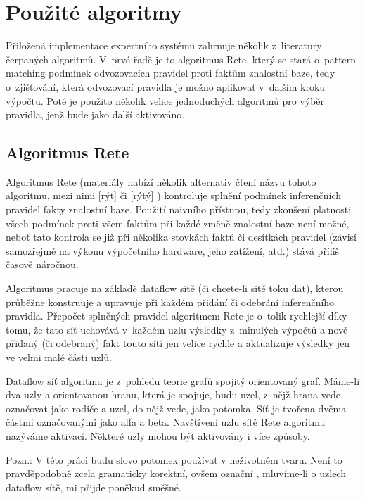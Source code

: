\section{Použité algoritmy}
Přiložená implementace expertního systému zahrnuje několik z~literatury
čerpaných algoritmů. V~prvé řadě je to algoritmus Rete, který se stará o~pattern
matching podmínek odvozovacích pravidel proti faktům znalostní baze, tedy
o~zjišťování, která odvozovací pravidla je možno aplikovat v~dalším kroku výpočtu.
Poté je použito několik velice jednoduchých algoritmů pro výběr pravidla, jenž
bude jako další aktivováno.

\subsection{Algoritmus Rete}

Algoritmus Rete (materiály nabízí několik alternativ čtení názvu tohoto algoritmu,
mezi nimi  [rýt] či  [rýtý] \cite{doorenbos}) kontroluje
splnění podmínek inferenčních pravidel fakty znalostní baze. Použití naivního
přístupu, tedy zkoušení platnosti všech podmínek proti všem faktům při každé
změně znalostní baze není možné, neboť tato kontrola se již při několika stovkách
faktů či desítkách pravidel (závisí samozřejmě na výkonu výpočetního hardware, jeho
zatížení, atd.) stává příliš časově náročnou.

Algoritmus pracuje na základě dataflow sítě (či chcete-li sítě toku dat),
kterou průběžne konstruuje a upravuje při každém přidání či odebrání
inferenčního pravidla. Přepočet splněných pravidel algoritmem Rete je o~tolik
rychlejší díky tomu, že tato síť uchovává v~každém uzlu výsledky z~minulých
výpočtů a nově přidaný (či odebraný) fakt touto sítí jen velice rychle
 a aktualizuje výsledky jen ve velmi malé části uzlů.

Dataflow síť algoritmu je z~pohledu teorie grafů spojitý orientovaný graf.
Máme-li dva uzly a orientovanou hranu, která je spojuje, budu uzel, z~nějž
hrana vede, označovat jako rodiče a uzel, do nějž vede, jako potomka.
Síť je tvořena dvěma částmi označovanými jako alfa a beta. Navštívení uzlu
sítě Rete algoritmu nazýváme aktivací. Některé uzly mohou být aktivovány
i více způsoby.

Pozn.: V této práci budu slovo potomek používat v neživotném tvaru. Není to
pravděpodobně zcela gramaticky korektní, ovšem označní ,
mluvíme-li o uzlech dataflow sítě, mi přijde poněkud směšné.

